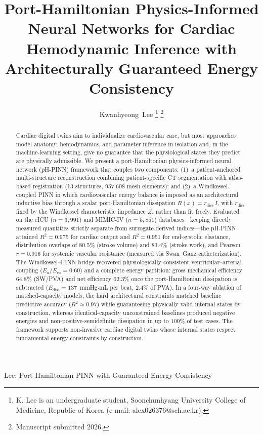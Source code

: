 \documentclass[journal]{IEEEtran}
\begin{document}
\title{Port-Hamiltonian Physics-Informed Neural Networks for Cardiac Hemodynamic Inference with Architecturally Guaranteed Energy Consistency}

\author{Kwanhyeong~Lee%
\thanks{K. Lee is an undergraduate student, Soonchunhyang University College of Medicine, Republic of Korea (e-mail: alex026376@sch.ac.kr).}%
\thanks{Manuscript submitted 2026.}}

%
{Lee: Port-Hamiltonian PINN with Guaranteed Energy Consistency}

\maketitle

\begin{abstract}
Cardiac digital twins aim to individualize cardiovascular care, but most approaches model anatomy, hemodynamics, and parameter inference in isolation and, in the machine-learning setting, give no guarantee that the physiological states they predict are physically admissible. We present a port-Hamiltonian physics-informed neural network (pH-PINN) framework that couples two components: (1)~a patient-anchored multi-structure reconstruction combining patient-specific CT segmentation with atlas-based registration (13 structures, 957{,}608 mesh elements); and (2)~a Windkessel-coupled PINN in which cardiovascular energy balance is imposed as an architectural inductive bias through a scalar port-Hamiltonian dissipation $R(x)=r_{\text{diss}}\,I$, with $r_{\text{diss}}$ fixed by the Windkessel characteristic impedance $Z_c$ rather than fit freely. Evaluated on the eICU ($n=3{,}991$) and MIMIC-IV ($n=5{,}851$) databases---keeping directly measured quantities strictly separate from surrogate-derived indices---the pH-PINN attained $R^2=0.975$ for cardiac output and $R^2=0.951$ for end-systolic elastance, distribution overlaps of $80.5\%$ (stroke volume) and $83.4\%$ (stroke work), and Pearson $r=0.916$ for systemic vascular resistance (measured via Swan--Ganz catheterization). The Windkessel--PINN bridge recovered physiologically consistent ventricular--arterial coupling ($E_a/E_{es}=0.60$) and a complete energy partition: gross mechanical efficiency $64.8\%$ (SW/PVA) and net efficiency $62.3\%$ once the port-Hamiltonian dissipation is subtracted ($E_{\text{diss}}=137$~mmHg$\cdot$mL per beat, $2.4\%$ of PVA). In a four-way ablation of matched-capacity models, the hard architectural constraints matched baseline predictive accuracy ($R^2\approx0.97$) while guaranteeing physically valid internal states by construction, whereas identical-capacity unconstrained baselines produced negative energies and non-positive-semidefinite dissipation in up to $100\%$ of test cases. The framework supports non-invasive cardiac digital twins whose internal states respect fundamental energy constraints by construction.
\end{abstract}
\end{document}
